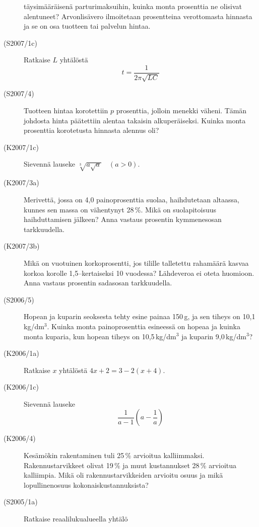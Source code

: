 \begin{description}
                        täysimääräisenä parturimaksuihin, kuinka monta prosenttia
                        ne olisivat alentuneet? Arvonlisävero ilmoitetaan prosentteina
                        verottomasta hinnasta ja se on osa tuotteen tai palvelun hintaa.
    \item[(S2007/1c)]  Ratkaise $L$ yhtälöstä
                        \[ t = \frac{1}{2\pi\sqrt{LC}} \]
    \item[(S2007/4)]   Tuotteen hintaa korotettiin $p$ prosenttia, jolloin menekki väheni.
                        Tämän johdosta hinta päätettiin alentaa takaisin alkuperäiseksi.
                        Kuinka monta prosenttia korotetusta hinnasta alennus oli?
    \item[(K2007/1c)]  Sievennä lauseke $ \sqrt[3]{a \sqrt{a}} \quad (a > 0) $.
    \item[(K2007/3a)]  Merivettä, jossa on 4,0 painoprosenttia suolaa, haihdutetaan
                        altaassa, kunnes sen massa on vähentynyt 28\,\%. Mikä on
                        suolapitoisuus haihduttamisen jälkeen? Anna vastaus prosentin
                        kymmenesosan tarkkuudella. 
    \item[(K2007/3b)]  Mikä on vuotuinen korkoprosentti, jos tilille talletettu rahamäärä
                        kasvaa korkoa korolle 1,5--kertaiseksi 10 vuodessa? Lähdeveroa
                        ei oteta huomioon. Anna vastaus prosentin sadasosan 
                        tarkkuudella.
    \item[(S2006/5)]   Hopean ja kuparin seoksesta tehty esine painaa 150\,g, ja sen
                        tiheys on 10,1\,kg/dm\(^3\). Kuinka monta painoprosenttia
                        esineessä on hopeaa ja kuinka monta kuparia, kun hopean tiheys on 
                        10,5\,kg/dm\(^3\) ja kuparin 9,0\,kg/dm\(^3\)?
    \item[(K2006/1a)]  Ratkaise $x$ yhtälöstä $4x + 2 =  3 - 2(x + 4)$.
    \item[(K2006/1c)]  Sievennä lauseke 
                        \[ \frac{1}{a - 1} \left( a - \frac{1}{a} \right) \]
    \item[(K2006/4)]   Kesämökin rakentaminen tuli 25\,\% arvioitua kalliimmaksi.
                        Rakennustarvikkeet olivat 19\,\% ja muut kustannukset 28\,\%
                        arvioitua kalliimpia. Mikä oli rakennustarvikkeiden arvioitu osuus ja 
                        mikä lopullinenosuus kokonaiskustannuksista?
    \item[(S2005/1a)]  Ratkaise reaalilukualueella yhtälö 

\end{description}
